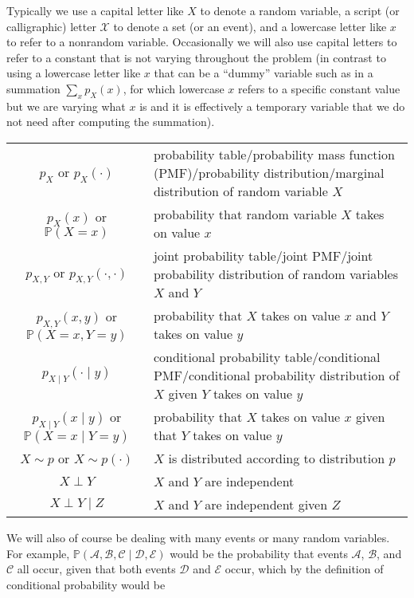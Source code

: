 \documentclass[6008notes.tex]{subfiles}
\begin{document}
Typically we use a capital letter like $X$ to denote a random variable, a script (or calligraphic) letter $\mathcal{X}$ to denote a set (or an event), and a lowercase letter like $x$ to refer to a nonrandom variable. Occasionally we will also use capital letters to refer to a constant that is not varying throughout the problem (in contrast to using a lowercase letter like $x$ that can be a ``dummy'' variable such as in a summation $\sum _{x}p_{X}(x)$, for which lowercase $x$ refers to a specific constant value but we are varying what $x$ is and it is effectively a temporary variable that we do not need after computing the summation).

{\renewcommand{\arraystretch}{2}
\begin{tabular}{c L}
$p_X$ or $p_{X}(\cdot )$	& probability table/probability mass function (PMF)/probability distribution/marginal distribution of random variable $X$ \\

$p_X(x)$ or $\mathbb {P}(X=x)$	& probability that random variable $X$ takes on value $x$ \\

$p_{X,Y}$ or $p_{X,Y}(\cdot ,\cdot )$	& joint probability table/joint PMF/joint probability distribution of random variables $X$ and $Y$ \\

$p_{X,Y}(x,y)$ or $\mathbb {P}(X=x,Y=y)$	& probability that $X$ takes on value $x$ and $Y$ takes on value $y$ \\
$p_{X\mid Y}(\cdot \mid y)$	& conditional probability table/conditional PMF/conditional probability distribution of $X$ given $Y$ takes on value $y$ \\
$p_{X\mid Y}(x\mid y)$ or $\mathbb {P}(X=x\mid Y=y)$	& probability that $X$ takes on value $x$ given that $Y$ takes on value $y$ \\
$X\sim p$ or $X\sim p(\cdot )$ &	$X$ is distributed according to distribution $p$ \\
$X\perp Y$	& $X$ and $Y$ are independent \\
$X\perp Y\mid Z$	& $X$ and $Y$ are independent given $Z$
\end{tabular}}

We will also of course be dealing with many events or many random variables. For example, $\mathbb {P}(\mathcal{A},\mathcal{B},\mathcal{C}\mid \mathcal{D},\mathcal{E})$ would be the probability that events $\mathcal{A}$, $\mathcal{B}$, and $\mathcal{C}$ all occur, given that both events $\mathcal{D}$ and $\mathcal{E}$ occur, which by the definition of conditional probability would be
\end{document}
